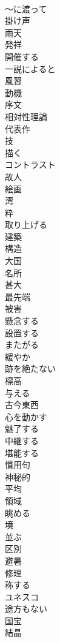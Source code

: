 \documentclass[8pt]{extreport}
\begin{document}
\begin{CJK}{UTF8}{min}
\\	～に渡って
\\	掛け声
\\	雨天
\\	発祥
\\	開催する
\\	一説によると
\\	風習
\\	動機
\\	序文
\\	相対性理論
\\	代表作
\\	技
\\	描く
\\	コントラスト
\\	故人
\\	絵画
\\	湾
\\	粋
\\	取り上げる
\\	建築
\\	構造
\\	大国
\\	名所
\\	甚大
\\	最先端
\\	被害
\\	懸念する
\\	設置する
\\	またがる
\\	緩やか
\\	跡を絶たない
\\	標高
\\	与える
\\	古今東西
\\	心を動かす
\\	魅了する
\\	中継する
\\	堪能する
\\	慣用句
\\	神秘的
\\	平均
\\	領域
\\	眺める
\\	境
\\	並ぶ
\\	区別
\\	避暑
\\	修理
\\	称する
\\	ユネスコ
\\	途方もない
\\	国宝
\\	結晶

\end{CJK}
\end{document}
